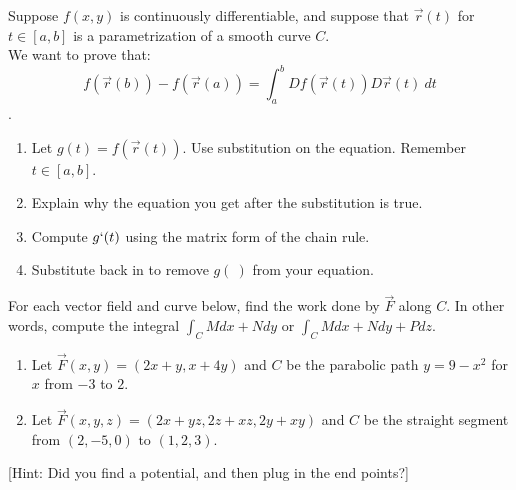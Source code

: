 \begin{problem}\label{prob:proof of fundamental thm2}
Suppose $f(x,y)$ is continuously differentiable, and suppose that $\vec r(t)$ for $t\in[a,b]$ is a parametrization of a smooth curve $C$.\\
We want to prove that:  $$f(\vec r(b))-f(\vec r(a)) = \int_a^b Df(\vec r(t))D\vec r(t)\ dt$$. 
\begin{enumerate}
	\item Let $g(t) = f(\vec r(t))$. Use substitution on the equation. Remember $t \in [a,b]$.
	\item Explain why the equation you get after the substitution is true.
	\item Compute $g`(t)$ using the matrix form of the chain rule. 
	\item Substitute back in to remove $g(\ )$ from your equation.
\end{enumerate}

\end{problem}

\begin{problem}
%
For each vector field and curve below, find the work done by $\vec F$ along $C$. In other words, compute the integral $\int_C Mdx+Ndy$ or $\int_C Mdx+Ndy+Pdz$. 
\begin{enumerate}
 \item{}%
 Let $\vec F(x,y) = (2x+y,x+4y)$ and $C$ be the parabolic path $y=9-x^2$ for $x$ from $-3$ to $2$.
 \item{}%
 Let $\vec F(x,y,z) = (2x+yz,2z+xz,2y+xy)$ and $C$ be the straight segment from $(2,-5,0)$ to $(1,2,3)$. 
\end{enumerate}
 [Hint: Did you find a potential, and then plug in the end points?]
\end{problem}

